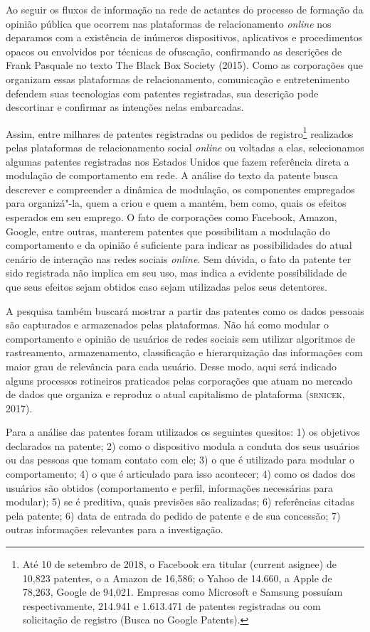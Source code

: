 Ao seguir os fluxos de informação na rede de actantes do processo de
formação da opinião pública que ocorrem nas plataformas de
relacionamento \emph{online} nos deparamos com a existência de inúmeros
dispositivos, aplicativos e procedimentos opacos ou envolvidos por
técnicas de ofuscação, confirmando as descrições de Frank Pasquale no
texto The Black Box Society (2015). Como as corporações que organizam
essas plataformas de relacionamento, comunicação e entretenimento
defendem suas tecnologias com patentes registradas, sua descrição pode
descortinar e confirmar as intenções nelas embarcadas.

Assim, entre milhares de patentes registradas ou pedidos de
registro\footnote{Até 10 de setembro de 2018, o Facebook era titular
  (current asignee) de 10,823 patentes, o a Amazon de 16,586; o Yahoo de
  14.660, a Apple de 78,263, Google de 94,021. Empresas como Microsoft e
  Samsung possuíam respectivamente, 214.941 e 1.613.471 de patentes
  registradas ou com solicitação de registro (Busca no Google Patents).}
realizados pelas plataformas de relacionamento social \emph{online} ou
voltadas a elas, selecionamos algumas patentes registradas nos Estados
Unidos que fazem referência direta a modulação de comportamento em rede.
A análise do texto da patente busca descrever e compreender a dinâmica
de modulação, os componentes empregados para organizá"-la, quem a criou e
quem a mantém, bem como, quais os efeitos esperados em seu emprego. O
fato de corporações como Facebook, Amazon, Google, entre outras,
manterem patentes que possibilitam a modulação do comportamento e da
opinião é suficiente para indicar as possibilidades do atual cenário de
interação nas redes sociais \emph{online}. Sem dúvida, o fato da patente ter
sido registrada não implica em seu uso, mas indica a evidente
possibilidade de que seus efeitos sejam obtidos caso sejam utilizadas
pelos seus detentores.

A pesquisa também buscará mostrar a partir das patentes como os dados
pessoais são capturados e armazenados pelas plataformas. Não há como
modular o comportamento e opinião de usuários de redes sociais sem
utilizar algoritmos de rastreamento, armazenamento, classificação e
hierarquização das informações com maior grau de relevância para cada
usuário. Desse modo, aqui será indicado alguns processos rotineiros
praticados pelas corporações que atuam no mercado de dados que organiza
e reproduz o atual capitalismo de plataforma (\textsc{srnicek}, 2017).

Para a análise das patentes foram utilizados os seguintes quesitos: 1)
os objetivos declarados na patente; 2) como o dispositivo modula a
conduta dos seus usuários ou das pessoas que tomam contato com ele; 3) o
que é utilizado para modular o comportamento; 4) o que é articulado para
isso acontecer; 4) como os dados dos usuários são obtidos (comportamento
e perfil, informações necessárias para modular); 5) se é preditiva,
quais previsões são realizadas; 6) referências citadas pela patente; 6)
data de entrada do pedido de patente e de sua concessão; 7) outras
informações relevantes para a investigação.

